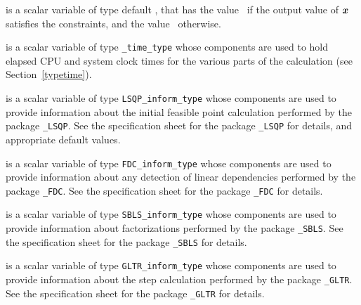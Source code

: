 \begin{description}
 is a scalar variable of type default \logical, that has the
value \true\ if the output value of ${\bm{x}}$ satisfies the constraints,
and the value \false\ otherwise.

 is a scalar variable of type {\tt \packagename\_time\_type} 
whose components are used to hold elapsed CPU  and system clock 
times for the various parts of the calculation (see Section~\ref{typetime}).

 is a scalar variable of type 
{\tt LSQP\_inform\_type}
whose components are used to provide information about the 
initial feasible point calculation
performed by the package 
{\tt \libraryname\_LSQP}. 
See the specification sheet for the package 
{\tt \libraryname\_LSQP} 
for details, and appropriate default values.

 is a scalar variable of type 
{\tt FDC\_inform\_type}
whose components are used to provide information about 
any detection of linear dependencies
performed by the package 
{\tt \libraryname\_FDC}. 
See the specification sheet for the package 
{\tt \libraryname\_FDC} for details.

 is a scalar variable of type 
{\tt SBLS\_inform\_type}
whose components are used to provide information about factorizations
performed by the package 
{\tt \libraryname\_SBLS}. 
See the specification sheet for the package 
{\tt \libraryname\_SBLS} for details.

 is a scalar variable of type 
{\tt GLTR\_inform\_type}
whose components are used to provide information about the step calculation
performed by the package 
{\tt \libraryname\_GLTR}. 
See the specification sheet for the package 
{\tt \libraryname\_GLTR} 
for details.

\end{description}
